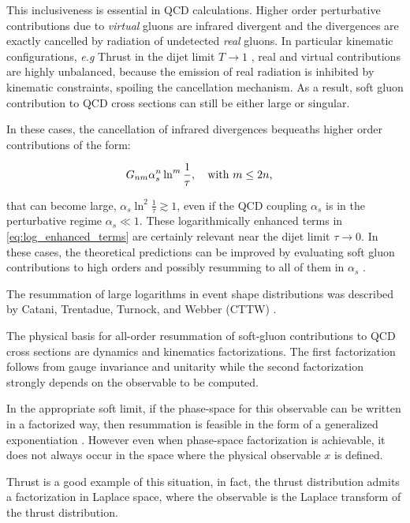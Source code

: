 \documentclass[../Tesi_Jiahao_Miao_986136.tex]{subfiles}
\begin{document}
This inclusiveness is essential in QCD calculations. Higher order perturbative contributions due to \emph{virtual}
gluons are infrared divergent and the divergences are exactly cancelled by radiation of undetected \emph{real} gluons.
In particular kinematic configurations, \emph{e.g} Thrust in the dijet limit $T \to 1$ ,   
real and virtual contributions are highly unbalanced, because the emission of real radiation is inhibited by kinematic constraints,
spoiling the cancellation mechanism. As a result, soft gluon contribution to QCD cross sections can still be either large or singular.

In these cases, the cancellation of infrared divergences bequeaths higher order contributions of the form:

\begin{equation}\label{eq:log_enhanced_terms}
    G_{nm} \alpha_s^n \ln^m \frac{1}{\tau} , \qq{with $m \le 2n $,}
\end{equation}

that can become large, $\alpha_s \ln^2\frac{1}{\tau}\gtrsim 1$, even if the QCD coupling $\alpha_s$ is in the perturbative regime $\alpha_s \ll 1$.
These logarithmically enhanced terms in \cref{eq:log_enhanced_terms} are certainly relevant near the dijet limit $\tau \to 0$.
In these cases, the theoretical predictions can be improved by evaluating soft gluon 
contributions to high orders and possibly resumming to all of them in $\alpha_s$ \cite{CATANI1991491,Monni:2011gb}.

The resummation of large logarithms in event shape distributions was described by Catani, Trentadue, Turnock, and Webber (CTTW) \cite{CATANI19933}.

The physical basis for all-order resummation of soft-gluon contributions to QCD cross sections are dynamics and kinematics factorizations. The first factorization follows from 
gauge invariance and unitarity while the second factorization strongly depends on the observable to be computed.

In the appropriate soft limit, if the phase-space for this observable can be written in a factorized way, then resummation is feasible in the form of a generalized exponentiation \cite{Sterman:1986aj}.
However even when phase-space factorization is achievable, it does not always occur in the space where the physical observable $x$ is defined.

Thrust is a good example of this situation, in fact, the thrust distribution admits a factorization in Laplace space, 
where the observable is the Laplace transform of the thrust distribution. 
\end{document}
